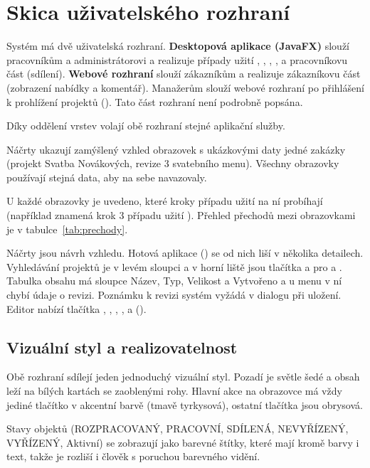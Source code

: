 \section{Skica uživatelského rozhraní}\label{sec:ui}

Systém má dvě uživatelská rozhraní. \textbf{Desktopová aplikace (JavaFX)} slouží pracovníkům a administrátorovi a realizuje případy užití , , , ,  a pracovníkovu část  (sdílení). \textbf{Webové rozhraní} slouží zákazníkům a realizuje zákazníkovu část  (zobrazení nabídky a komentář). Manažerům slouží webové rozhraní po přihlášení k prohlížení projektů (). Tato část rozhraní není podrobně popsána.

Díky oddělení vrstev volají obě rozhraní stejné aplikační služby.

Náčrty ukazují zamýšlený vzhled obrazovek s ukázkovými daty jedné zakázky (projekt Svatba Novákových, revize 3 svatebního menu). Všechny obrazovky používají stejná data, aby na sebe navazovaly.

U každé obrazovky je uvedeno, které kroky případu užití na ní probíhají (například  znamená krok 3 případu užití ). Přehled přechodů mezi obrazovkami je v tabulce~\ref{tab:prechody}.

Náčrty jsou návrh vzhledu. Hotová aplikace () se od nich liší v několika detailech. Vyhledávání projektů je v levém sloupci a v horní liště jsou tlačítka  a  pro  a . Tabulka obsahu má sloupce Název, Typ, Velikost a Vytvořeno a u menu v ní chybí údaje o revizi. Poznámku k revizi systém vyžádá v dialogu při uložení. Editor nabízí tlačítka , , , ,  a  ().

\subsection{Vizuální styl a realizovatelnost}

Obě rozhraní sdílejí jeden jednoduchý vizuální styl. Pozadí je světle šedé a obsah leží na bílých kartách se zaoblenými rohy. Hlavní akce na obrazovce má vždy jediné tlačítko v akcentní barvě (tmavě tyrkysová), ostatní tlačítka jsou obrysová.

Stavy objektů (ROZPRACOVANÝ, PRACOVNÍ, SDÍLENÁ, NEVYŘÍZENÝ, VYŘÍZENÝ, Aktivní) se zobrazují jako barevné štítky, které mají kromě barvy i text, takže je rozliší i člověk s poruchou barevného vidění.

